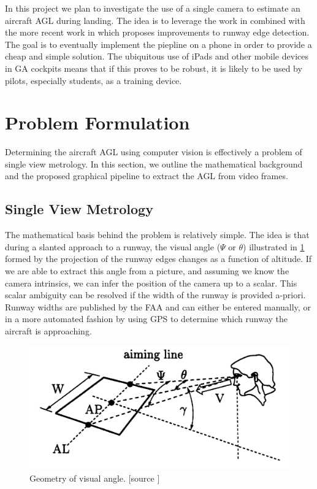 \documentclass[letterpaper, conference]{IEEEtran}  %
\begin{document}
In this project we plan to investigate the use of a single camera to estimate an aircraft AGL during landing. The idea is to leverage the work in \cite{Sasa2000} combined with the more recent work in \cite{Naidu2011} which proposes improvements to runway edge detection. The goal is to eventually implement the piepline on a phone in order to provide a cheap and simple solution. The ubiquitous use of iPads and other mobile devices in GA cockpits means that if this proves to be robust, it is likely to be used by pilots, especially students, as a training device.

\section{Problem Formulation}
Determining the aircraft AGL using computer vision is effectively a problem of single view metrology. In this section, we outline the mathematical background and the proposed graphical pipeline to extract the AGL from video frames. 

\subsection{Single View Metrology}
The mathematical basis behind the problem is relatively simple. The idea is that during a slanted approach to a runway, the visual angle ($\Psi$ or $\theta$) illustrated in \cref{fig:visangle} formed by the projection of the runway edges changes as a function of altitude. If we are able to extract this angle from a picture, and assuming we know the camera intrinsics, we can infer the position of the camera up to a scalar. This scalar ambiguity can be resolved if the width of the runway is provided a-priori. Runway widths are published by the FAA and can either be entered manually, or in a more automated fashion by using GPS to determine which runway the aircraft is approaching.
\begin{figure}[h!]
	\includegraphics[width= \columnwidth]{visual_angle1.png} 
	\caption{\label{fig:visangle} Geometry of visual angle. [source \cite{Mulder2000}]}
\end{figure}
\end{document}
